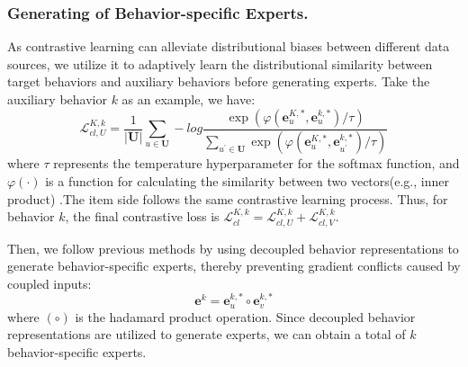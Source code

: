 \subsubsection{Generating of Behavior-specific Experts.}
As contrastive learning can alleviate distributional biases between different data sources, we utilize it to adaptively learn the distributional similarity between target behaviors and auxiliary behaviors before generating experts. Take the auxiliary behavior $k$ as an example, we have:
\begin{equation}
\mathcal{L}_{cl,U}^{K,k}=\frac{1}{|\mathbf{U}|}\sum_{u\in\mathbf{U}}-log\frac{\exp(\varphi(\mathbf{e}_u^{K,*},\mathbf{e}_u^{k,*})/\tau)}{\sum_{u^{\prime}\in\mathbf{U}}\exp(\varphi(\mathbf{e}_u^{K,*},\mathbf{e}_{u^{\prime}}^{k,*})/\tau)}
\end{equation}
where $\tau$ represents the temperature hyperparameter for the softmax function, and 
$\varphi(\cdot)$ is a function for calculating the similarity between two vectors(e.g., inner product) .The item side follows the same contrastive learning process. Thus, for behavior $k$, the final contrastive loss is $\mathcal{L}_{cl}^{K,k} =\mathcal{L}_{cl,U}^{K,k}+\mathcal{L}_{cl,V}^{K,k}$.

Then, we follow previous methods\cite{cigf} by using decoupled behavior representations to generate behavior-specific experts, thereby preventing gradient conflicts caused by coupled inputs:
\begin{equation}
\mathbf{e}^{k} = \mathbf{e}_u^{k,*} \circ \mathbf{e}_v^{k,*}
\end{equation}
where $(\circ)$ is the hadamard product operation. Since decoupled behavior representations are  utilized to generate experts, we can obtain a total of $k$ behavior-specific experts.

